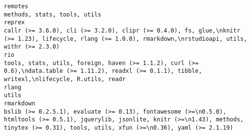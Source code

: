 \documentclass[
  letterpaper,
  DIV=11,
  numbers=noendperiod]{scrreprt}
\begin{document}
\begin{verbatim}
remotes                                                                                                                                                                                                                                                                                                                                                                                                                                                                                                                                                                                       methods, stats, tools, utils
reprex                                                                                                                                                                                                                                                                                                                                                                                                                                                        callr (>= 3.6.0), cli (>= 3.2.0), clipr (>= 0.4.0), fs, glue,\nknitr (>= 1.23), lifecycle, rlang (>= 1.0.0), rmarkdown,\nrstudioapi, utils, withr (>= 2.3.0)
rio                                                                                                                                                                                                                                                                                                                                                                                                                                                                 tools, stats, utils, foreign, haven (>= 1.1.2), curl (>= 0.6),\ndata.table (>= 1.11.2), readxl (>= 0.1.1), tibble, writexl,\nlifecycle, R.utils, readr
rlang                                                                                                                                                                                                                                                                                                                                                                                                                                                                                                                                                                                                                utils
rmarkdown                                                                                                                                                                                                                                                                                                                                                                                                        bslib (>= 0.2.5.1), evaluate (>= 0.13), fontawesome (>=\n0.5.0), htmltools (>= 0.5.1), jquerylib, jsonlite, knitr (>=\n1.43), methods, tinytex (>= 0.31), tools, utils, xfun (>=\n0.36), yaml (>= 2.1.19)

\end{verbatim}
\end{document}
